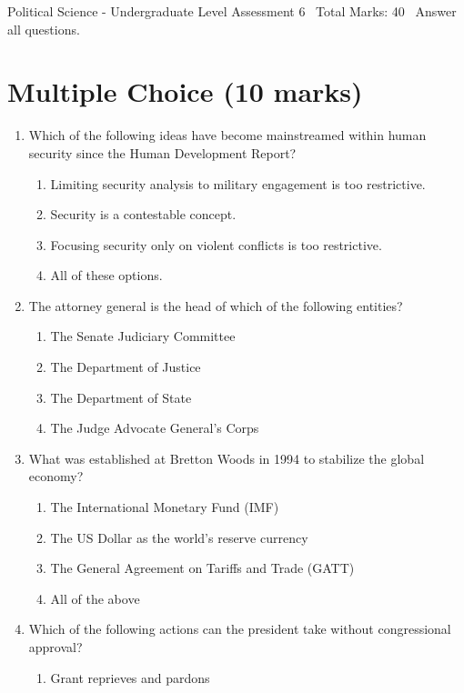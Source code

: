 \documentclass[12pt]{article}
\begin{document}
\begin{center}
Political Science - Undergraduate Level Assessment 6 \
Total Marks: 40 \
Answer all questions.
\end{center}

\section*{Multiple Choice (10 marks)}
\begin{enumerate}[label=\arabic*.]
\item Which of the following ideas have become mainstreamed within human security since the Human Development Report?
\begin{enumerate}[label=(\alph*)]
    \item Limiting security analysis to military engagement is too restrictive.
    \item Security is a contestable concept.
    \item Focusing security only on violent conflicts is too restrictive.
    \item All of these options.
\end{enumerate}
\item The attorney general is the head of which of the following entities?
\begin{enumerate}[label=(\alph*)]
    \item The Senate Judiciary Committee
    \item The Department of Justice
    \item The Department of State
    \item The Judge Advocate General's Corps
\end{enumerate}
\item What was established at Bretton Woods in 1994 to stabilize the global economy?
\begin{enumerate}[label=(\alph*)]
    \item The International Monetary Fund (IMF)
    \item The US Dollar as the world's reserve currency
    \item The General Agreement on Tariffs and Trade (GATT)
    \item All of the above
\end{enumerate}
\item Which of the following actions can the president take without congressional approval?
\begin{enumerate}[label=(\alph*)]
    \item Grant reprieves and pardons

\end{enumerate}
\end{enumerate}
\end{document}
